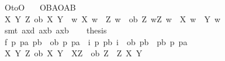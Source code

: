 \begin{isabellebody}
\endisatagproof
{\isafoldproof}%
%
\isadelimproof
\isanewline
%
\endisadelimproof
\isanewline
{}\isamarkupfalse%
\ O{\isacharunderscore}to{\isacharunderscore}O{\isacharcolon}\isanewline
\ \ \ {\isachardoublequoteopen}{\isasymTurnstile}{\isacharparenleft}O{\isacharbraceleft}B{\isacharbar}A{\isacharbraceright}\isactrlbold {\isasymrightarrow}O{\isacharbraceleft}{\isacharparenleft}A\isactrlbold {\isasymrightarrow}B{\isacharparenright}{\isacharbar}\isactrlbold {\isasymtop}{\isacharbraceright}{\isacharparenright}{\isachardoublequoteclose}\isanewline
%
\isadelimproof
%
\endisadelimproof
%
\isatagproof
{}\isamarkupfalse%
{\isacharminus}\isanewline
\ \ \isamarkupfalse%
\ {\isachardoublequoteopen}{\isasymforall}X\ Y\ Z{\isachardot}\ {\isacharparenleft}ob\ X\ Y\ {\isasymand}\ {\isacharparenleft}{\isasymforall}w{\isachardot}\ X\ w\ {\isasymlongrightarrow}\ Z\ w{\isacharparenright}{\isacharparenright}\ {\isasymlongrightarrow}\ ob\ Z\ {\isacharparenleft}{\isasymlambda}w{\isachardot}{\isacharparenleft}Z\ w\ {\isasymand}\ {\isasymnot}X\ w{\isacharparenright}\ {\isasymor}\ Y\ w{\isacharparenright}{\isachardoublequoteclose}\isanewline
\ \ \isamarkupfalse%
\ {\isacharparenleft}smt\ ax{\isacharunderscore}{}d\ ax{\isacharunderscore}{}b\ ax{\isacharunderscore}{}b{\isacharprime}{\isacharprime}{\isacharparenright}\isanewline
\ \ \isamarkupfalse%
\ {\isacharquery}thesis\isanewline
\ \ \isamarkupfalse%
\ {\isacharminus}\isanewline
\ \ \ \ \isamarkupfalse%
\ f{}{\isacharcolon}\ {\isachardoublequoteopen}{\isasymforall}p\ pa\ pb{\isachardot}\ {\isacharparenleft}{\isacharparenleft}{\isasymnot}\ {\isacharparenleft}ob\ p\ pa{\isacharparenright}{\isacharparenright}\ {\isasymor}\ {\isacharparenleft}{\isasymexists}i{\isachardot}\ {\isacharparenleft}p\isactrlbold {\isasymand}{\isacharparenleft}\isactrlbold {\isasymnot}\ pb{\isacharparenright}{\isacharparenright}\ i{\isacharparenright}{\isacharparenright}\ {\isasymor}\ {\isacharparenleft}ob\ pb\ {\isacharparenleft}\isactrlbold {\isasymor}\ {\isacharparenleft}pb\isactrlbold {\isasymand}{\isacharparenleft}\isactrlbold {\isasymnot}\ p{\isacharparenright}{\isacharparenright}\ pa{\isacharparenright}{\isacharparenright}{\isachardoublequoteclose}\isanewline
\ \ \ \ \ \ \isamarkupfalse%
\ {\isacartoucheopen}{\isasymforall}X\ Y\ Z{\isachardot}\ ob\ X\ Y\ {\isasymand}\ {\isacharparenleft}{\isasymTurnstile}{\isacharparenleft}X\isactrlbold {\isasymrightarrow}Z{\isacharparenright}{\isacharparenright}\ {\isasymlongrightarrow}\ ob\ Z\ {\isacharparenleft}\isactrlbold {\isasymor}\ {\isacharparenleft}Z\isactrlbold {\isasymand}{\isacharparenleft}\isactrlbold {\isasymnot}\ X{\isacharparenright}{\isacharparenright}\ Y{\isacharparenright}{\isacartoucheclose}\ \isamarkupfalse%

\end{isabellebody}
